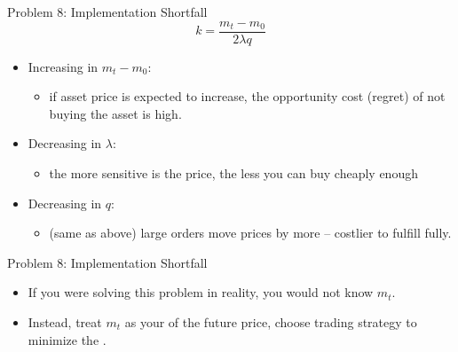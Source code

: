 \begin{frame}{Problem 8: Implementation Shortfall}
	$$ k = \frac{m_t - m_0}{2\lambda q} $$
	\begin{itemize}
		\item Increasing in $m_t - m_0$:
		\begin{itemize}
			\item if asset price is expected to increase, the opportunity cost (regret) of not buying the asset is high.
		\end{itemize}
		\item Decreasing in $\lambda$:
		\begin{itemize}
			\item the more sensitive is the price, the less you can buy cheaply enough
		\end{itemize}
		\item Decreasing in $q$:
		\begin{itemize}
			\item (same as above) large orders move prices by more -- costlier to fulfill fully.
		\end{itemize}
	\end{itemize}
\end{frame}


\begin{frame}{Problem 8: Implementation Shortfall}
	\begin{itemize}
		\item If you were solving this problem in reality, you would not know $m_t$.
		\item Instead, treat $m_t$ as your  of the future price, choose trading strategy to minimize the .
	\end{itemize}
\end{frame}

 